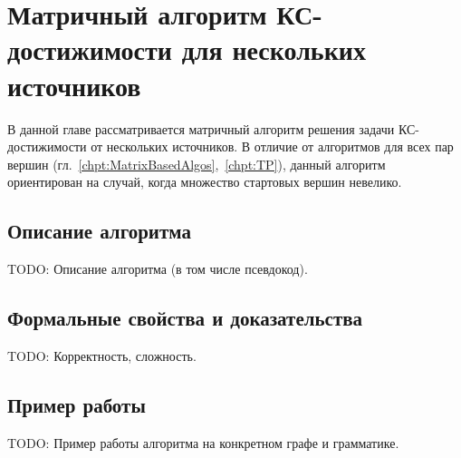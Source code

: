 \setchapterpreamble[u]{\margintoc}
\chapter{Матричный алгоритм КС-достижимости для нескольких источников}
\label{chpt:MatrixMS-CFPQ}

В данной главе рассматривается матричный алгоритм решения задачи КС-достижимости от нескольких источников.
В отличие от алгоритмов для всех пар вершин (гл.~\ref{chpt:MatrixBasedAlgos},~\ref{chpt:TP}), данный алгоритм ориентирован на случай, когда множество стартовых вершин невелико.

\section{Описание алгоритма}

TODO: Описание алгоритма (в том числе псевдокод).

\section{Формальные свойства и доказательства}

TODO: Корректность, сложность.

\section{Пример работы}

TODO: Пример работы алгоритма на конкретном графе и грамматике.
